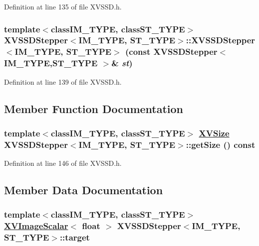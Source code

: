 Definition at line 135 of file XVSSD.h.\label{XVSSDStepper_a2}
\hypertarget{class_XVSSDStepper_a2}{
\subsubsection[XVSSDStepper]{\setlength{\rightskip}{0pt plus 5cm}template$<$classIM\_\-TYPE, classST\_\-TYPE$>$ XVSSDStepper$<$IM\_\-TYPE, ST\_\-TYPE$>$::XVSSDStepper$<$IM\_\-TYPE, ST\_\-TYPE$>$ (const XVSSDStepper$<$ IM\_\-TYPE,ST\_\-TYPE $>$\& {\em st})}}




Definition at line 139 of file XVSSD.h.

\subsection{Member Function Documentation}
\label{XVSSDStepper_a3}
\hypertarget{class_XVSSDStepper_a3}{
\subsubsection[getSize]{\setlength{\rightskip}{0pt plus 5cm}template$<$classIM\_\-TYPE, classST\_\-TYPE$>$ \hyperlink{class_XVSize}{XVSize} XVSSDStepper$<$IM\_\-TYPE, ST\_\-TYPE$>$::get\-Size () const}}




Definition at line 146 of file XVSSD.h.

\subsection{Member Data Documentation}
\label{XVSSDStepper_n0}
\hypertarget{class_XVSSDStepper_n0}{
\subsubsection[target]{\setlength{\rightskip}{0pt plus 5cm}template$<$classIM\_\-TYPE, classST\_\-TYPE$>$ \hyperlink{class_XVImageScalar}{XVImage\-Scalar}$<$ float $>$ XVSSDStepper$<$IM\_\-TYPE, ST\_\-TYPE$>$::target}}




